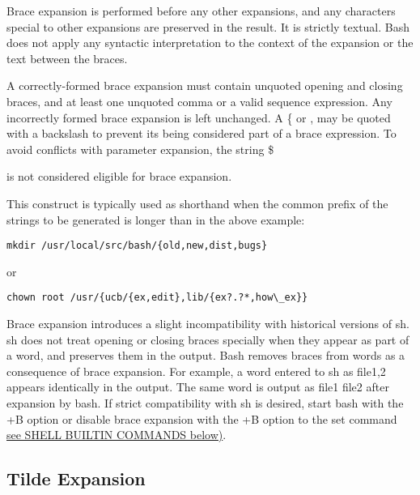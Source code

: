 Brace expansion is performed before any other expansions, and any characters special to other expansions are preserved in the result. It is strictly textual. Bash does not apply any syntactic interpretation to the context of the expansion or the text between the braces.

A correctly-formed brace expansion must contain unquoted opening and closing braces, and at least one unquoted comma or a valid sequence expression. Any incorrectly formed brace expansion is left unchanged. A \{ or , may be quoted with a backslash to prevent its being considered part of a brace expression. To avoid conflicts with parameter expansion, the string \${ is not considered eligible for brace expansion.

This construct is typically used as shorthand when the common prefix of the strings to be generated is longer than in the above example:

\begin{lstlisting}
mkdir /usr/local/src/bash/{old,new,dist,bugs}
\end{lstlisting}

or

\begin{lstlisting}
chown root /usr/{ucb/{ex,edit},lib/{ex?.?*,how\_ex}}
\end{lstlisting}

Brace expansion introduces a slight incompatibility with historical versions of sh. sh does not treat opening or closing braces specially when they appear as part of a word, and preserves them in the output. Bash removes braces from words as a consequence of brace expansion. For example, a word entered to sh as file{1,2} appears identically in the output. The same word is output as file1 file2 after expansion by bash. If strict compatibility with sh is desired, start bash with the +B option or disable brace expansion with the +B option to the set command \hyperref[sec:shellbuiltincommands]{see SHELL BUILTIN COMMANDS below)}.

\subsection{Tilde Expansion}\label{sec:tildeexpansion}

}
